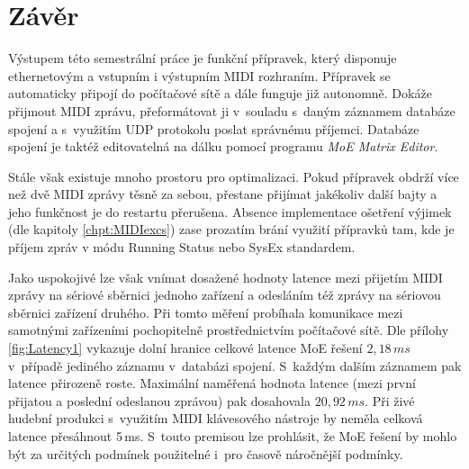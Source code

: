 \chapter*{Závěr}
{}

Výstupem této semestrální práce je funkční přípravek, který disponuje ethernetovým a vstupním i výstupním \acs{MIDI} rozhraním. Přípravek se automaticky připojí do počítačové sítě a dále funguje již autonomně. Dokáže přijmout \acs{MIDI} zprávu, přeformátovat ji v~souladu s~daným záznamem databáze spojení a s~využitím \acs{UDP} protokolu poslat správnému příjemci. Databáze spojení je taktéž editovatelná na dálku pomocí programu \emph{MoE Matrix Editor}. 

Stále však existuje mnoho prostoru pro optimalizaci. Pokud přípravek obdrží více než dvě \acs{MIDI} zprávy těsně za sebou, přestane přijímat jakékoliv další bajty a jeho funkčnost je do restartu přerušena. Absence implementace ošetření výjimek (dle kapitoly \ref{chpt:MIDIexcs}) zase prozatím brání využití přípravků tam, kde je příjem zpráv v módu Running Status nebo SysEx standardem.

Jako uspokojivé lze však vnímat dosažené hodnoty latence mezi přijetím \acs{MIDI} zprávy na sériové sběrnici jednoho zařízení a odesláním též zprávy na sériovou sběrnici zařízení druhého. Při tomto měření probíhala komunikace mezi samotnými zařízeními pochopitelně prostřednictvím počítačové sítě. Dle přílohy \ref{fig:Latency1} vykazuje dolní hranice celkové latence \acs{MoE} řešení $2{,}18\,\unit{ms}$ v~případě jediného záznamu v~databázi spojení. S~každým dalším záznamem pak latence přirozeně roste. Maximální naměřená hodnota latence (mezi první přijatou a poslední odeslanou zprávou) pak dosahovala $20{,}92\,\unit{ms}$. Při živé hudební produkci s~využitím \acs{MIDI} klávesového nástroje by neměla celková latence přesáhnout 5\,ms. S~touto premisou lze prohlásit, že \acs{MoE} řešení by mohlo být za určitých podmínek použitelné i~pro časově náročnější podmínky.